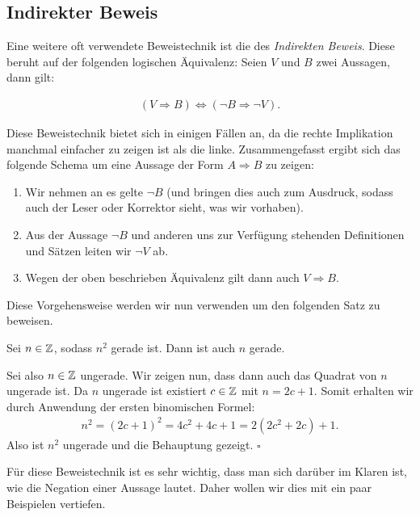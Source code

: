 \begin{proof*}
\end{proof*}

\subsection{Indirekter Beweis}
Eine weitere oft verwendete Beweistechnik ist die des \textit{Indirekten Beweis}. Diese beruht auf der folgenden logischen Äquivalenz: 
Seien $V$ und $B$ zwei Aussagen, dann gilt: 

\begin{align}
    (V \Rightarrow B) \iff (\neg B \Rightarrow \neg V). 
\end{align}

Diese Beweistechnik bietet sich in einigen Fällen an, da die rechte Implikation manchmal einfacher zu zeigen ist als die linke. 
Zusammengefasst ergibt sich das folgende Schema um eine Aussage der Form $A \Rightarrow B$ zu zeigen: 
\begin{enumerate}
    \item 
    Wir nehmen an es gelte $\neg B$ (und bringen dies auch zum Ausdruck, sodass auch der Leser oder Korrektor sieht, was wir vorhaben).
    \item 
    Aus der Aussage $\neg B$ und anderen uns zur Verfügung stehenden Definitionen und Sätzen leiten wir $\neg V$ ab. 
    \item 
    Wegen der oben beschrieben Äquivalenz gilt dann auch $V \Rightarrow B$. 
\end{enumerate}
Diese Vorgehensweise werden wir nun verwenden um den folgenden Satz zu beweisen. 
\begin{theorem}
    Sei $n \in \mathbb{Z}$, sodass $n^2$ gerade ist. Dann ist auch $n$ gerade. 
\end{theorem}
\begin{proof*}
    Sei also $n \in \mathbb{Z}$ ungerade. Wir zeigen nun, dass dann auch das Quadrat von $n$ ungerade ist. Da $n$ ungerade ist existiert $c \in \mathbb{Z}$ mit $n = 2c + 1$. 
    Somit erhalten wir durch Anwendung der ersten binomischen Formel: 
    \begin{align*}
        n^2 = (2c +1)^2 = 4c^2 + 4c + 1 = 2(2c^2+2c) + 1 . 
    \end{align*}
    Also ist $n^2$ ungerade und die Behauptung gezeigt. 
    \hfill $\square$
\end{proof*}

Für diese Beweistechnik ist es sehr wichtig, dass man sich darüber im Klaren ist, wie die Negation einer Aussage lautet. Daher wollen wir dies mit ein paar Beispielen vertiefen.  


